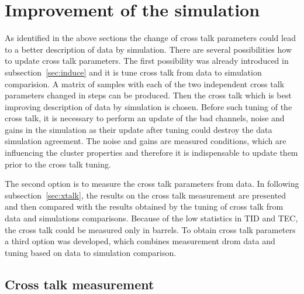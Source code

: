 
\newpage

\section{Improvement of the simulation}

As identified in the above sections the change of cross talk parameters could lead to a better description of data by simulation. There are several possibilities how to update cross talk parameters. The first possibility was already introduced in subsection~\ref{sec:induce} and it is tune cross talk from data to simulation comparision. A matrix of samples with each of the two independent cross talk parameters changed in steps can be produced. Then the cross talk which is best improving description of data by simulation is chosen. Before such tuning of the cross talk, it is necessary to perform an update of the bad channels, noise and gains in the simulation as their update after tuning could destroy the data simulation agreement. The noise and gains are measured conditions, which are influencing the cluster properties and therefore it is indispensable to update them prior to the cross talk tuning.


The second option is to measure the cross talk parameters from data. In following subsection~\ref{sec:xtalk}, the results on the cross talk measurement are presented and then compared with the results obtained by the tuning of cross talk from data and simulations comparisons. Because of the low statistics in TID and TEC, the cross talk could be measured only in barrels. To obtain cross talk parameters a third option was developed, which combines measurement drom data and tuning based on data to simulation comparison.

\subsection{Cross talk  measurement~\label{sec:xtalk}}

